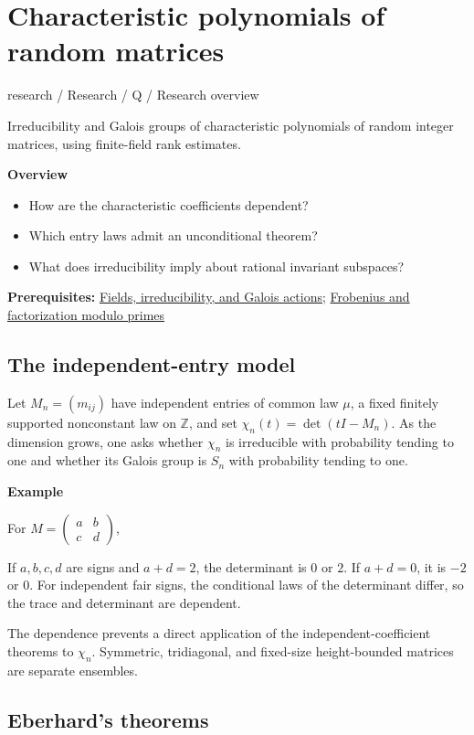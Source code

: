 \documentclass[11pt,a4paper,oneside,openany]{book}
\newcommand{\atlasdisplay}[1]{\par\begingroup\centering\vspace{3pt}\noindent\adjustbox{max width=\linewidth}{\(\displaystyle #1\)}\par\vspace{5pt}\endgroup}
\begin{document}
\chapter{Characteristic polynomials of random matrices}\label{article:random-matrices}\hypertarget{article:random-matrices}{}\color{black}
{\sffamily\small\color{atlasgold}research / Research / Q / Research overview}\par\medskip
Irreducibility and Galois groups of characteristic polynomials of random integer matrices, using finite-field rank estimates.\par\medskip
\textbf{Overview}\begin{itemize}
\item How are the characteristic coefficients dependent?
\item Which entry laws admit an unconditional theorem?
\item What does irreducibility imply about rational invariant subspaces?
\end{itemize}
{\small\textbf{Prerequisites:} \hyperlink{article:foundations}{Fields, irreducibility, and Galois actions}; \hyperlink{article:frobenius}{Frobenius and factorization modulo primes}}\par
{}\section{The independent-entry model}
\color{black} Let \(M_n=(m_{ij})\) have independent entries of common law \(\mu\), a fixed finitely supported nonconstant law on \(\mathbb Z\), and set \(\chi_n(t)=\det(tI-M_n)\). As the dimension grows, one asks whether \(\chi_n\) is irreducible with probability tending to one and whether its Galois group is \(S_n\) with probability tending to one.\par

\begin{atlasblock}[standard]
\textbf{\sffamily Example}\par\smallskip
\color{black} For \(M=\begin{pmatrix}a&b\\c&d\end{pmatrix}\),\par

\atlasdisplay{\chi_M(t)=t^2-(a+d)t+(ad-bc).}
\color{black} If \(a,b,c,d\) are signs and \(a+d=2\), the determinant is \(0\) or \(2\). If \(a+d=0\), it is \(-2\) or \(0\). For independent fair signs, the conditional laws of the determinant differ, so the trace and determinant are dependent.\par
\end{atlasblock}\color{black}
\color{black} The dependence prevents a direct application of the independent-coefficient theorems to \(\chi_n\). Symmetric, tridiagonal, and fixed-size height-bounded matrices are separate ensembles.\par
{}\section{Eberhard's theorems}
\end{document}
